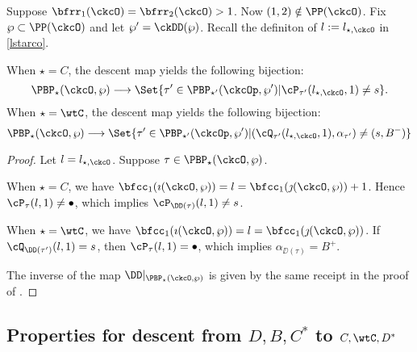 \documentclass[ssunip]{subfiles}
\begin{document}
Suppose $\bfrr_1(\ckcO) = \bfrr_2(\ckcO)>1$. Now $(1,2)\notin \PP(\ckcO)$. 
Fix $\wp\subset \PP(\ckcO)$ and let $\wp' = \ckDD(\wp)$. 
Recall the definiton of $l:=l_{\star,\ckcO}$ in \eqref{lstarco}. 
\begin{prop}
When $\star = C$, the descent map yields the following bijection:
\[
\PBP_\star(\ckcO,\wp)\longrightarrow  \Set{\tau'\in \PBP_{\star'}(\ckcOp,\wp')| 
\cP_{\tau'}(l_{\star,\ckcO},1)\neq s}.
\]
When $\star = \wtC$, the descent map yields the following bijection:
\[
\PBP_\star(\ckcO,\wp)\longrightarrow 
 \Set{\tau'\in \PBP_{\star'}(\ckcOp,\wp')| 
(\cQ_{\tau'}(l_{\star,\ckcO},1),\alpha_{\tau'})\neq (s,B^-) }
\]
\end{prop}
\begin{proof}
Let $l = l_{\star,\ckcO}$.
Suppose $\tau\in\PBP_\star(\ckcO,\wp)$.

When $\star = C$, we have $\bfcc_1(\imath(\ckcO,\wp)) =l = \bfcc_1(\jmath(\ckcO,\wp))+1$.
Hence $\cP_\tau(l,1)\neq \bullet$, which implies 
$\cP_{\DD(\tau)}(l,1)\neq s$.

When $\star = \wtC$, we have $\bfcc_1(\imath(\ckcO,\wp)) = l = \bfcc_1(\jmath(\ckcO,\wp))$.
If $\cQ_{\DD(\tau')}(l,1) = s$,  
then $\cP_\tau(l,1) = \bullet$, which implies 
$\alpha_{\DD(\tau)} = B^+$.

The inverse of the map $\DD|_{\PBP_\star(\ckcO,\wp)}$ is given by the same 
receipt in the proof of .
\end{proof}

\subsection{Properties for descent from $D,B,C^*$ to $C,\wtC,D^*$}
\end{document}

